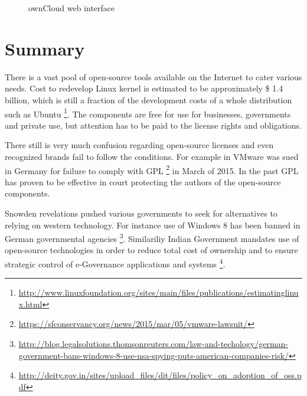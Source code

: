\documentclass{article}
\begin{document}
\begin{figure}[!htb]
\centering
{}
\caption{ownCloud web interface}
\label{fig:digraph}
\end{figure}








\section{Summary}

There is a vast pool of open-source tools available on the Internet
to cater various needs.
Cost to redevelop Linux kernel is estimated to be
approximately \$ 1.4 billion, which is still a fraction
of the development costs of a whole distribution such as Ubuntu
\footnote{\url{
http://www.linuxfoundation.org/sites/main/files/publications/estimatinglinux.html}}.
The components are free for use for businesses, governments and
private use, but attention has to be paid to the license
rights and obligations.

There still is very much confusion regarding open-source licenses
and even recognized brands fail to follow the conditions.
For example in VMware was sued in Germany for failure to comply with GPL
\footnote{\url{https://sfconservancy.org/news/2015/mar/05/vmware-lawsuit/}} in March of 2015.
In the past GPL has proven to be effective in court protecting
the authors of the open-source components.


Snowden revelations pushed various governments to seek for alternatives
to relying on western technology.
For instance use of Windows 8 has been banned in German governmental agencies
\footnote{\url{http://blog.legalsolutions.thomsonreuters.com/law-and-techology/german-government-bans-windows-8-use-nsa-spying-puts-american-companies-risk/}}.
Similariliy Indian Government mandates use of open-source technologies
in order to reduce total cost of ownership and to ensure
strategic control of e-Governance applications and systems
\footnote{\url{http://deity.gov.in/sites/upload_files/dit/files/policy_on_adoption_of_oss.pdf}}.
\end{document}
